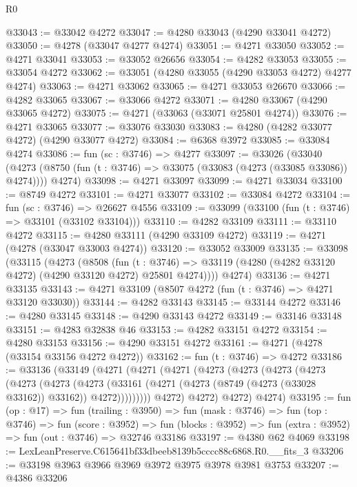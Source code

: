 \begin{lexlean}{R0}
\begin{coremodule}
@33043 := @33042 @4272
@33047 := @4280 @33043 (@4290 @33041 @4272)
@33050 := @4278 (@33047 @4277 @4274)
@33051 := @4271 @33050
@33052 := @4271 @33041
@33053 := @33052 @26656
@33054 := @4282 @33053
@33055 := @33054 @4272
@33062 := @33051 (@4280 @33055 (@4290 @33053 @4272) @4277 @4274)
@33063 := @4271 @33062
@33065 := @4271 @33053 @26670
@33066 := @4282 @33065
@33067 := @33066 @4272
@33071 := @4280 @33067 (@4290 @33065 @4272)
@33075 := @4271 (@33063 (@33071 @25801 @4274))
@33076 := @4271 @33065
@33077 := @33076 @33030
@33083 := @4280 (@4282 @33077 @4272) (@4290 @33077 @4272)
@33084 := @6368 @3972
@33085 := @33084 @4274
@33086 := fun (sc : @3746) => @4277
@33097 := @33026
    (@33040
      (@4273 (@8750 (fun (t : @3746) => @33075 (@33083 (@4273 (@33085 @33086)) @4274))))
      @4274)
@33098 := @4271 @33097
@33099 := @4271 @33034
@33100 := @8749 @4272
@33101 := @4271 @33077
@33102 := @33084 @4272
@33104 := fun (sc : @3746) => @26627 @4556
@33109 := @33099 (@33100 (fun (t : @3746) => @33101 (@33102 @33104)))
@33110 := @4282 @33109
@33111 := @33110 @4272
@33115 := @4280 @33111 (@4290 @33109 @4272)
@33119 := @4271 (@4278 (@33047 @33003 @4274))
@33120 := @33052 @33009
@33135 := @33098
    (@33115
      (@4273
        (@8508
          (fun (t : @3746) =>
          @33119 (@4280 (@4282 @33120 @4272) (@4290 @33120 @4272) @25801 @4274))))
      @4274)
@33136 := @4271 @33135
@33143 := @4271 @33109 (@8507 @4272 (fun (t : @3746) => @4271 @33120 @33030))
@33144 := @4282 @33143
@33145 := @33144 @4272
@33146 := @4280 @33145
@33148 := @4290 @33143 @4272
@33149 := @33146 @33148
@33151 := @4283 @32838 @46
@33153 := @4282 @33151 @4272
@33154 := @4280 @33153
@33156 := @4290 @33151 @4272
@33161 := @4271 (@4278 (@33154 @33156 @4272 @4272))
@33162 := fun (t : @3746) => @4272
@33186 := @33136
    (@33149
      (@4271
        (@4271
          (@4271
            (@4273
              (@4273
                (@4273
                  (@4273
                    (@4273
                      (@4273
                        (@4273
                          (@33161
                            (@4271 (@4273 (@8749 (@4273 (@33028 @33162)) @33162)) @4272)))))))))
            @4272)
          @4272)
        @4272)
      @4274)
@33195 := fun (op : @17) =>
  fun (trailing : @3950) =>
  fun (mask : @3746) =>
  fun (top : @3746) =>
  fun (score : @3952) =>
  fun (blocks : @3952) => fun (extra : @3952) => fun (out : @3746) => @32746 @33186
@33197 := @4380 @62 @4069
@33198 := LexLeanPreserve.C615641bf33dbeeb8139b5cccc88c6868.R0.__fits_3
@33206 := @33198 @3963 @3966 @3969 @3972 @3975 @3978 @3981 @3753
@33207 := @4386 @33206

\end{coremodule}
\end{lexlean}
